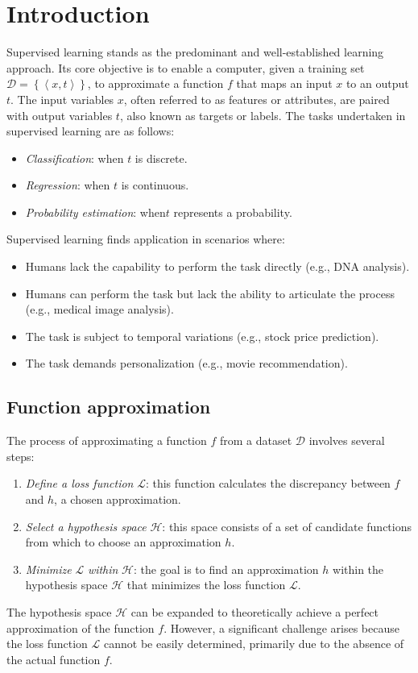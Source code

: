 \section{Introduction}

Supervised learning stands as the predominant and well-established learning approach. 
Its core objective is to enable a computer, given a training set $\mathcal{D}=\left\{\left\langle x,t \right\rangle\right\}$, to approximate a function $f$ that maps an input $x$ to an output $t$.
The input variables $x$, often referred to as features or attributes, are paired with output variables $t$, also known as targets or labels. 
The tasks undertaken in supervised learning are as follows:
\begin{itemize}
    \item \textit{Classification}: when $t$ is discrete. 
    \item \textit{Regression}: when $t$ is continuous. 
    \item \textit{Probability estimation}: when$t$ represents a probability.
\end{itemize}
Supervised learning finds application in scenarios where:
\begin{itemize}
    \item Humans lack the capability to perform the task directly (e.g., DNA analysis).
    \item Humans can perform the task but lack the ability to articulate the process (e.g., medical image analysis).
    \item The task is subject to temporal variations (e.g., stock price prediction).
    \item The task demands personalization (e.g., movie recommendation).
\end{itemize}

\subsection{Function approximation}
The process of approximating a function $f$ from a dataset $\mathcal{D}$ involves several steps:
\begin{enumerate}
    \item \textit{Define a loss function} $\mathcal{L}$: this function calculates the discrepancy between $f$ and $h$, a chosen approximation.
    \item \textit{Select a hypothesis space} $\mathcal{H}$: this space consists of a set of candidate functions from which to choose an approximation $h$. 
    \item \textit{Minimize} $\mathcal{L}$ \textit{within} $\mathcal{H}$: the goal is to find an approximation $h$ within the hypothesis space $\mathcal{H}$ that minimizes the loss function $\mathcal{L}$.
\end{enumerate}
The hypothesis space $\mathcal{H}$ can be expanded to theoretically achieve a perfect approximation of the function $f$. 
However, a significant challenge arises because the loss function $\mathcal{L}$ cannot be easily determined, primarily due to the absence of the actual function $f$.

